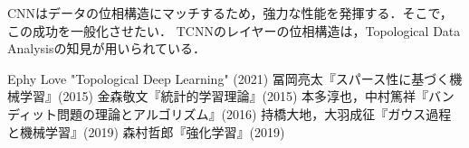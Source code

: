 \documentclass[uplatex,dvipdfmx]{jsreport}
\begin{document}
\begin{tcolorbox}[colframe=ForestGreen, colback=ForestGreen!10!white,breakable,colbacktitle=ForestGreen!40!white,coltitle=black,fonttitle=\bfseries\sffamily,
title=]
    CNNはデータの位相構造にマッチするため，強力な性能を発揮する．そこで，この成功を一般化させたい．
    TCNNのレイヤーの位相構造は，Topological Data Analysisの知見が用いられている．
\end{tcolorbox}

\begin{thebibliography}{9}
    Ephy Love "Topological Deep Learning" (2021)
    冨岡亮太『スパース性に基づく機械学習』(2015)
    金森敬文『統計的学習理論』(2015)
    本多淳也，中村篤祥『バンディット問題の理論とアルゴリズム』(2016)
    持橋大地，大羽成征『ガウス過程と機械学習』(2019)
    森村哲郎『強化学習』(2019)
\end{thebibliography}
\end{document}
